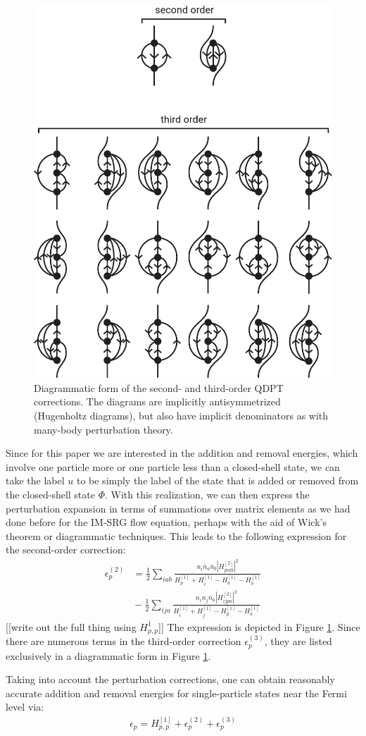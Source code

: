 \begin{figure}
\includegraphics[width=.48\linewidth]{fig-diagrams-sfe}
\caption{Diagrammatic form of the second- and third-order QDPT corrections.  The diagrams are implicitly antisymmetrized (Hugenholtz diagrams), but also have implicit denominators as with many-body perturbation theory.}
\label{fig:diagrams-sfe}
\end{figure}

Since for this paper we are interested in the addition and removal energies, which involve one particle more or one particle less than a closed-shell state, we can take the label $u$ to be simply the label of the state that is added or removed from the closed-shell state $\Phi$.  With this realization, we can then express the perturbation expansion in terms of summations over matrix elements as we had done before for the IM-SRG flow equation, perhaps with the aid of Wick's theorem or diagrammatic techniques.  This leads to the following expression for the second-order correction:
\begin{align*}
  \epsilon_p^{(2)}
  &=
  \frac{1}{2} \sum_{i a b} \frac{n_i \bar{n}_a \bar{n}_b |H^{[2]}_{p i a b}|^2}{H^{[1]}_p + H^{[1]}_i - H^{[1]}_a - H^{[1]}_b} \\
  &{}-
  \frac{1}{2} \sum_{i j a} \frac{n_i n_j \bar{n}_a |H^{[2]}_{i j p a}|^2}{H^{[1]}_i + H^{[1]}_j - H^{[1]}_p - H^{[1]}_a}
\end{align*}
[[write out the full thing using $H^1_{p,p}$]]
The expression is depicted in Figure \ref{fig:diagrams-sfe}.  Since there are numerous terms in the third-order correction $\epsilon_p^{(3)}$, they are listed exclusively in a diagrammatic form in Figure \ref{fig:diagrams-sfe}.

Taking into account the perturbation corrections, one can obtain reasonably accurate addition and removal energies for single-particle states near the Fermi level via:
\begin{align*}
  \epsilon_p = H^{[1]}_{p, p} + \epsilon_p^{(2)} + \epsilon_p^{(3)}
\end{align*}

